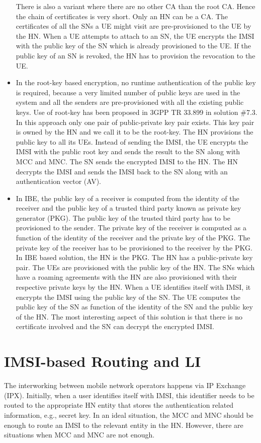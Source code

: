 \documentclass[conference]{IEEEtran}
\begin{document}
\begin{itemize}
There is also a variant where there are no other CA than the root CA. Hence the chain of certificates is very short. Only an HN can be a CA. The certificates of all the SNs a UE might visit are pre-provisioned to the UE by the HN. When a UE attempts to attach to an SN, the UE encrypts the IMSI with the public key of the SN which is already provisioned to the UE. If the public key of an SN is revoked, the HN has to provision the revocation to the UE.

\item In the root-key based encryption, no runtime authentication of the public key is required, because a very limited number of public keys are used in the system and all the senders are pre-provisioned with all the existing public keys. Use of root-key has been proposed in 3GPP TR 33.899 in solution \#7.3. In this approach only one pair of public-private key pair exists. This key pair is owned by the HN and we call it to be the root-key. The HN provisions the public key to all its UEs.  Instead of sending the IMSI, the UE encrypts the IMSI with the public root key and sends the result to the SN along with MCC and MNC. The SN sends the encrypted IMSI to the HN. The HN decrypts the IMSI and sends the IMSI back to the SN along with an authentication vector (AV).

\item In IBE, the public key of a receiver is computed from the identity of the receiver and the public key of a trusted third party known as private key generator (PKG). The public key of the trusted third party has to be provisioned to the sender. The private key of the receiver is computed as a function of the identity of the receiver and the private key of the PKG. The private key of the receiver has to be provisioned to the receiver by the PKG. In IBE based solution, the HN is the PKG. The HN has a public-private key pair. The UEs are provisioned with the public key of the HN. The SNs which have a roaming agreements with the HN are also provisioned with their respective private keys by the HN. When a UE identifies itself with IMSI, it encrypts the IMSI using the public key of the SN. The UE computes the public key of the SN as function of the identity of the SN and the public key of the HN. The most interesting aspect of this solution is that there is no certificate involved and the SN can decrypt the encrypted IMSI.
\end{itemize}

\section{IMSI-based Routing and LI}
The interworking between mobile network operators happens via IP Exchange (IPX). Initially, when a user identifies itself with IMSI, this identifier needs to be routed to the appropriate HN entity that stores the authentication related information, e.g., secret key. In an ideal situation, the MCC and MNC should be enough to route an IMSI to the relevant entity in the HN. However, there are situations when MCC and MNC are not enough. 
\end{document}
